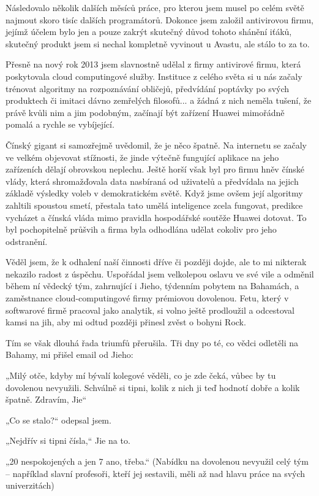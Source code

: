 Následovalo několik dalších měsíců práce, pro kterou jsem musel po celém světě najmout skoro tisíc dalších programátorů. Dokonce jsem založil antivirovou firmu, jejímž účelem bylo jen a pouze zakrýt skutečný důvod tohoto shánění iťáků, skutečný produkt jsem si nechal kompletně vyvinout u Avastu, ale stálo to za to.

Přesně na nový rok 2013 jsem slavnostně udělal z firmy antivirové firmu, která poskytovala cloud computingové služby. Instituce z celého světa si u nás začaly trénovat algoritmy na rozpoznávání obličejů, předvídání poptávky po svých produktech či imitaci dávno zemřelých filosofů... a žádná z nich neměla tušení, že právě kvůli nim a jim podobným,  začínají být zařízení Huawei mimořádně pomalá a rychle se vybíjející.

Čínský gigant si samozřejmě uvědomil, že je něco špatně. Na internetu se začaly ve velkém objevovat stížnosti, že jinde výtečně fungující aplikace na jeho zařízeních dělají obrovskou neplechu. Ještě horší však byl pro firmu hněv čínské vlády, která shromažďovala data nasbíraná od uživatelů a předvídala na jejich základě výsledky voleb v demokratickém světě. Když jsme ovšem její algoritmy zahltili spoustou smetí, přestala tato umělá inteligence zcela fungovat, predikce vycházet a čínská vláda mimo pravidla hospodářské soutěže Huawei dotovat. To byl pochopitelně průšvih a firma byla odhodlána udělat cokoliv pro jeho odstranění.  

Věděl jsem, že k odhalení naší činnosti dříve či později dojde, ale to mi nikterak nekazilo radost z úspěchu. Uspořádal jsem velkolepou oslavu ve své vile a odměnil během ní vědecký tým, zahrnující i Jieho, týdenním pobytem na Bahamách, a zaměstnance cloud-computingové firmy prémiovou dovolenou. Fetu, který v softwarové firmě pracoval jako analytik, si volno ještě prodloužil a odcestoval kamsi na jih, aby mi odtud později přinesl zvěst o bohyni Rock.

Tím se však dlouhá řada triumfů přerušila. Tři dny po té, co vědci odletěli na Bahamy, mi přišel email od Jieho:

„Milý otče, kdyby mí bývalí kolegové věděli, co je zde čeká, vůbec by tu dovolenou nevyužili. Schválně si tipni, kolik z nich ji teď hodnotí dobře a kolik špatně. Zdravím, Jie“

„Co se stalo?“ odepsal jsem.

„Nejdřív si tipni čísla,“ Jie na to.

„20 nespokojených a jen 7 ano, třeba.“ (Nabídku na dovolenou nevyužil celý tým – například slavní profesoři, kteří jej sestavili, měli až nad hlavu práce na svých univerzitách)

